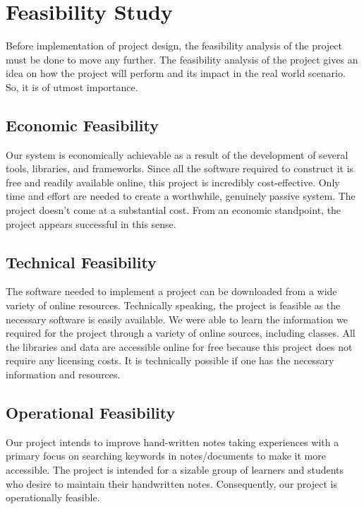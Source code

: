  \section{Feasibility Study}
 Before implementation of project design, the feasibility analysis of the project must be
done to move any further. The feasibility analysis of the project gives an idea on how the
project will perform and its impact in the real world scenario. So, it is of utmost
importance.
 \subsection{Economic Feasibility}
 Our system is economically achievable as a result of the development of several tools,
libraries, and frameworks. Since all the software required to construct it is free and
readily available online, this project is incredibly cost-effective. Only time and effort are
needed to create a worthwhile, genuinely passive system. The project doesn’t come at a
substantial cost. From an economic standpoint, the project appears successful in this
sense.
 \subsection{Technical Feasibility}
 The software needed to implement a project can be downloaded from a wide variety of
online resources. Technically speaking, the project is feasible as the necessary software is
easily available. We were able to learn the information we required for the project
through a variety of online sources, including classes. All the libraries and data are
accessible online for free because this project does not require any licensing costs. It is
technically possible if one has the necessary information and resources.
 \subsection{Operational Feasibility}
 Our project intends to improve hand-written notes taking experiences with a primary
focus on searching keywords in notes/documents to make it more accessible. The project
is intended for a sizable group of learners and students who desire to maintain their
handwritten notes. Consequently, our project is operationally feasible.
